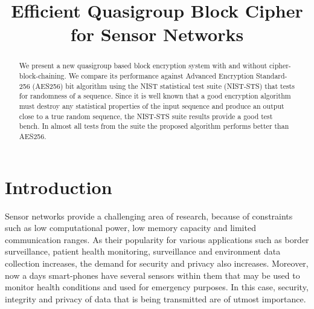 \documentclass[conference]{IEEEtran}
\begin{document}
\title{Efficient Quasigroup Block Cipher for Sensor Networks}

\author{
\and
{}
}

\maketitle

\begin{abstract}
We present a new quasigroup based block encryption system with and without cipher-block-chaining. We compare its performance against Advanced Encryption Standard-256 (AES256) bit algorithm using the NIST statistical test suite (NIST-STS) that tests for randomness of a sequence. Since it is well known that a good encryption algorithm must destroy any statistical properties of the input sequence and produce an output close to a true random sequence, the NIST-STS suite results provide a good test bench. In almost all tests from the suite the proposed algorithm performs better than AES256.
\end{abstract}

\section{Introduction}
Sensor networks provide a challenging area of research, because of constraints such as low computational power, low memory capacity and limited communication ranges. As their popularity for various applications such as border surveillance, patient health monitoring, surveillance and environment data collection increases, the demand for security and privacy also increases. Moreover, now a days smart-phones have several sensors within them that may be used to monitor health conditions and used for emergency purposes. In this case, security, integrity and privacy of data that is being transmitted are of utmost importance.
\end{document}
